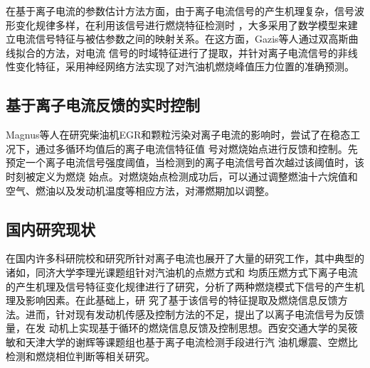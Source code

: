在基于离子电流的参数估计方法方面，由于离子电流信号的产生机理复杂，信号波形变化规律多样，在利用该信号进行燃烧特征检测时
，大多采用了数学模型来建立电流信号特征与被估参数之间的映射关系。在这方面，Gazis等人\cite{panousakis2006ion}通过双高斯曲线拟合的方法，对电流
信号的时域特征进行了提取，并针对离子电流信号的非线性变化特征，采用神经网络方法实现了对汽油机燃烧峰值压力位置的准确预测。
\subsection{基于离子电流反馈的实时控制}
Magnus等人\cite{glavmo1999closed}在研究柴油机EGR和颗粒污染对离子电流的影响时，尝试了在稳态工况下，通过多循环均值后的离子电流信特征值
号对燃烧始点进行反馈和控制。先预定一个离子电流信号强度阈值，当检测到的离子电流信号首次越过该阈值时，该时刻被定义为燃烧
始点。对燃烧始点检测成功后，可以通过调整燃油十六烷值和空气、燃油以及发动机温度等相应方法，对滞燃期加以调整。
\subsection{国内研究现状}
在国内许多科研院校和研究所针对离子电流也展开了大量的研究工作，其中典型的诸如，同济大学李理光课题组\cite{dgy2011,zqy2011,fqw2012,zzybh2012,cyb2013}针对汽油机的点燃方式和
均质压燃方式下离子电流的产生机理及信号特征变化规律进行了研究，分析了两种燃烧模式下信号的产生机理及影响因素。在此基础上，研
究了基于该信号的特征提取及燃烧信息反馈方法。进而，针对现有发动机传感及控制方法的不足，提出了以离子电流信号为反馈量，在发
动机上实现基于循环的燃烧信息反馈及控制思想。西安交通大学的吴筱敏\cite{gh2010}和天津大学的谢辉等课题组也基于离子电流检测手段进行汽
油机爆震、空燃比检测和燃烧相位判断等相关研究。
